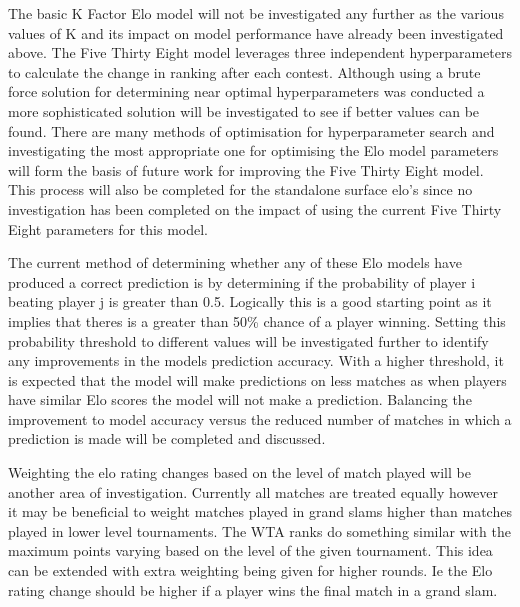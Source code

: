 \documentclass[12pt,a4paper]{article}
\begin{document}
The basic K Factor Elo model will not be investigated any further as the various values
of K and its impact on model performance have already been investigated above. The Five
Thirty Eight model leverages three independent hyperparameters to calculate the change
in ranking after each contest. Although using a brute force solution for determining near
optimal hyperparameters was conducted a more sophisticated solution will be investigated to
see if better values can be found. There are many methods of optimisation for
hyperparameter search \cite{claesen_hyperparameter_2015} and investigating the
most appropriate one for optimising the Elo model parameters will form the basis of
future work for improving the Five Thirty Eight model. This process will also be completed
for the standalone surface elo's since no investigation has been completed on the impact of
using the current Five Thirty Eight parameters for this model.

The current method of determining whether any of these Elo models have produced a correct
prediction is by determining if the probability of player i beating player j is greater
than 0.5. Logically this is a good starting point as it implies that theres is a greater
than 50\% chance of a player winning. Setting this probability threshold to different values
will be investigated further to identify any improvements in the models prediction accuracy.
With a higher threshold, it is expected that the model will make predictions on less
matches as when players have similar Elo scores the model will not make a prediction.
Balancing the improvement to model accuracy versus the reduced number of matches in which
a prediction is made will be completed and discussed.

Weighting the elo rating changes based on the level of match played will be another area of
investigation. Currently all matches are treated equally however it may be beneficial to weight
matches played in grand slams higher than matches played in lower level tournaments. The WTA ranks
do something similar with the maximum points varying based on the level of the given tournament.
This idea can be extended with extra weighting being given for higher rounds. Ie the Elo rating
change should be higher if a player wins the final match in a grand slam.
\clearpage
\end{document}
